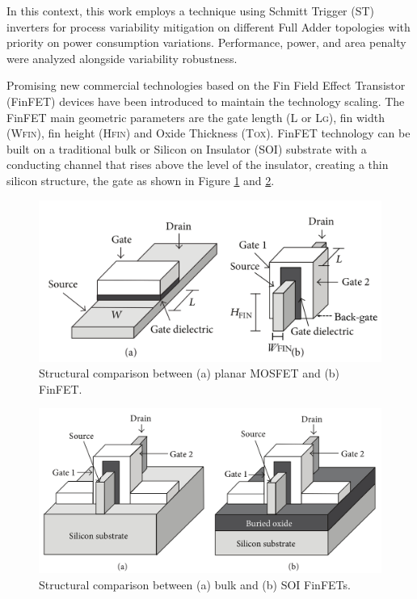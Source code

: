 \documentclass[ecp,tc, english]{iiufrgs}
\begin{document}
In this context, this work employs a technique using Schmitt Trigger (ST) inverters for process variability mitigation on different Full Adder topologies with priority on power consumption variations. Performance, power, and area penalty were analyzed alongside variability robustness. 

Promising new commercial technologies based on the Fin Field Effect Transistor (FinFET) devices have been introduced to maintain the technology scaling. The FinFET main geometric parameters are the gate length (L or L\textsc{g}), fin width (W\textsc{fin}), fin height (H\textsc{fin}) and Oxide Thickness (T\textsc{ox}). FinFET technology can be built on a traditional bulk or Silicon on Insulator (SOI) substrate with a conducting channel that rises above the level of the insulator, creating a thin silicon structure, the gate as shown in Figure \ref{mosfetvsfinfet} and \ref{bulkvssoi}. 

\begin{figure}[H]
\centering
\includegraphics[width=\textwidth, trim={0 0cm 0 0cm},clip]{finfet.pdf}
\caption{Structural comparison between (a) planar MOSFET and (b) FinFET.}
\label{mosfetvsfinfet}
\end{figure}

\begin{figure}[H]
\centering
\includegraphics[width=\textwidth, trim={0 0cm 0 0cm},clip]{finfet2.png}
\caption{Structural comparison between (a) bulk and (b) SOI FinFETs.}
\label{bulkvssoi}
\end{figure}
\end{document}
